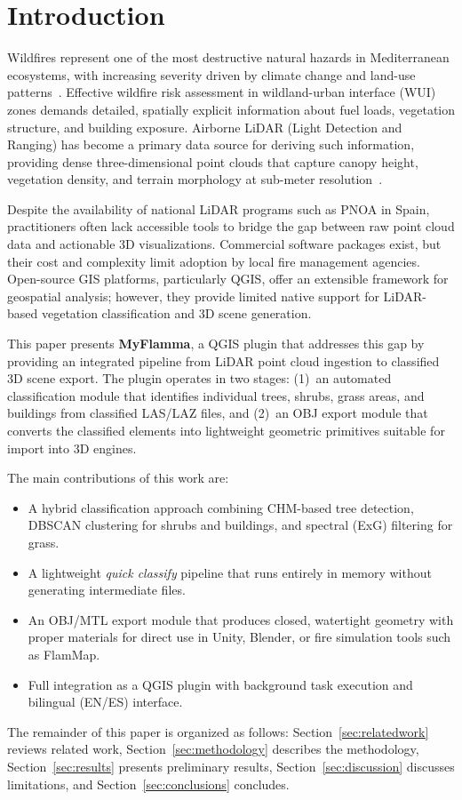 \section{Introduction}
\label{sec:introduction}

Wildfires represent one of the most destructive natural hazards in Mediterranean ecosystems, with increasing severity driven by climate change and land-use patterns~\cite{bowman2009fire}. Effective wildfire risk assessment in wildland-urban interface (WUI) zones demands detailed, spatially explicit information about fuel loads, vegetation structure, and building exposure. Airborne LiDAR (Light Detection and Ranging) has become a primary data source for deriving such information, providing dense three-dimensional point clouds that capture canopy height, vegetation density, and terrain morphology at sub-meter resolution~\cite{riano2003}.

Despite the availability of national LiDAR programs such as PNOA in Spain, practitioners often lack accessible tools to bridge the gap between raw point cloud data and actionable 3D visualizations. Commercial software packages exist, but their cost and complexity limit adoption by local fire management agencies. Open-source GIS platforms, particularly QGIS, offer an extensible framework for geospatial analysis; however, they provide limited native support for LiDAR-based vegetation classification and 3D scene generation.

This paper presents \textbf{MyFlamma}, a QGIS plugin that addresses this gap by providing an integrated pipeline from LiDAR point cloud ingestion to classified 3D scene export. The plugin operates in two stages: (1)~an automated classification module that identifies individual trees, shrubs, grass areas, and buildings from classified LAS/LAZ files, and (2)~an OBJ export module that converts the classified elements into lightweight geometric primitives suitable for import into 3D engines.

The main contributions of this work are:
\begin{itemize}
    \item A hybrid classification approach combining CHM-based tree detection, DBSCAN clustering for shrubs and buildings, and spectral (ExG) filtering for grass.
    \item A lightweight \textit{quick classify} pipeline that runs entirely in memory without generating intermediate files.
    \item An OBJ/MTL export module that produces closed, watertight geometry with proper materials for direct use in Unity, Blender, or fire simulation tools such as FlamMap.
    \item Full integration as a QGIS plugin with background task execution and bilingual (EN/ES) interface.
\end{itemize}

The remainder of this paper is organized as follows: Section~\ref{sec:relatedwork} reviews related work, Section~\ref{sec:methodology} describes the methodology, Section~\ref{sec:results} presents preliminary results, Section~\ref{sec:discussion} discusses limitations, and Section~\ref{sec:conclusions} concludes.
